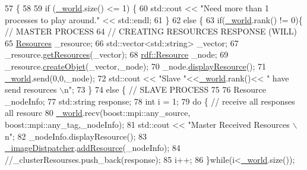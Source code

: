 \begin{DoxyCode}
57                                                \{
58     
59     \textcolor{keywordflow}{if} (\hyperlink{classrdf_1_1DistributionManager_ac8a061176717baf96b2913cd22dcbf20}{\_world}.size() <= 1) \{
60         std::cout << \textcolor{stringliteral}{"Need more than 1 processes to play around."} << std::endl;
61     \}
62     \textcolor{keywordflow}{else} \{ 
63         \textcolor{keywordflow}{if}(\hyperlink{classrdf_1_1DistributionManager_ac8a061176717baf96b2913cd22dcbf20}{\_world}.rank() != 0)\{             \textcolor{comment}{// MASTER PROCESS}
64            \textcolor{comment}{// CREATING RESOURCES RESPONSE (WILL) }
65             \hyperlink{classResources}{Resources} \_resource;
66             std::vector<std::string> \_vector;
67             \_resource.\hyperlink{classResources_a9dfd1c5bb25dfe6d8d3fbb1d3b913bac}{getResources}(\_vector);
68             \hyperlink{classrdf_1_1Resource}{rdf::Resource} \_node;
69             \_resource.\hyperlink{classResources_ac1c8e38749088e3fc4211d9e3d72d18c}{createObjet}(\_vector,\_node);
70             \_node.\hyperlink{classrdf_1_1Resource_a494a37b398f88c9180215f7d2a56104a}{displayResource}();
71             \hyperlink{classrdf_1_1DistributionManager_ac8a061176717baf96b2913cd22dcbf20}{\_world}.send(0,0,\_node);  
72             std::cout << \textcolor{stringliteral}{"Slave "}<<\hyperlink{classrdf_1_1DistributionManager_ac8a061176717baf96b2913cd22dcbf20}{\_world}.rank()<< \textcolor{stringliteral}{" have send resources \(\backslash\)n"};
73         \}
74         \textcolor{keywordflow}{else} \{                             \textcolor{comment}{// SLAVE PROCESS}
75 
76             Resource \_nodeInfo;
77             std::string response; 
78             \textcolor{keywordtype}{int} i = 1;
79             \textcolor{keywordflow}{do} \{                            \textcolor{comment}{// receive all responses all resourc}
80                 \hyperlink{classrdf_1_1DistributionManager_ac8a061176717baf96b2913cd22dcbf20}{\_world}.recv(boost::mpi::any\_source, boost::mpi::any\_tag,\_nodeInfo);
81                 std::cout << \textcolor{stringliteral}{"Master Received Resources \(\backslash\)n"};
82                 \_nodeInfo.displayResource();
83                 \hyperlink{classrdf_1_1DistributionManager_a43d6497690b1040281e7dfd64ed4dc65}{\_imageDistpatcher}.\hyperlink{classrdf_1_1ImageDispatcher_a900b639d7be2ac5e4e48b5a7aa879182}{addResource}(\_nodeInfo);
84                 \textcolor{comment}{//\_clusterResourses.push\_back(response);}
85                 i++;
86             \}\textcolor{keywordflow}{while}(i<\hyperlink{classrdf_1_1DistributionManager_ac8a061176717baf96b2913cd22dcbf20}{\_world}.size());

\end{DoxyCode}
